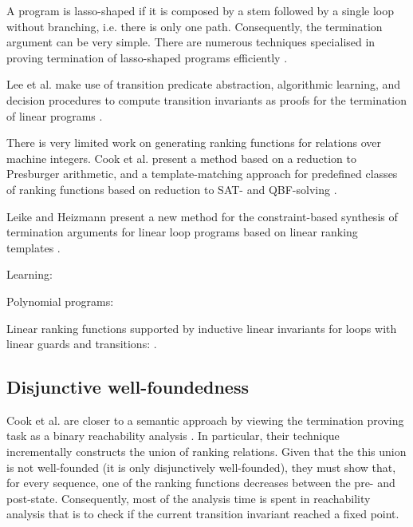 \documentclass[preprint]{sigplanconf}
\theoremstyle{definition}
\begin{document}
A program is lasso-shaped if it is composed by a stem followed by a single loop without branching, i.e. there is only one path. 
Consequently, the termination argument can be very simple. There are numerous techniques specialised in
proving termination of lasso-shaped programs efficiently \cite{DBLP:conf/popl/Ben-AmramG13,DBLP:conf/cav/BradleyMS05,DBLP:conf/atva/HeizmannHLP13,DBLP:conf/vmcai/P04}. 

Lee et al. make use of transition predicate abstraction, algorithmic learning, and decision procedures to compute transition
invariants as proofs for the termination of linear programs \cite{DBLP:conf/cav/LeeWY12}.

There is very limited work on generating ranking functions for relations over machine integers.
Cook et al. present a method based on a reduction to Presburger
arithmetic, and a template-matching approach for predefined classes of
ranking functions based on reduction to SAT- and QBF-solving \cite{DBLP:conf/tacas/CookKRW10}.

Leike and Heizmann present a new method for the constraint-based synthesis
of termination arguments for linear loop programs based on
linear ranking templates \cite{DBLP:conf/tacas/LeikeH14}.

Learning: \cite{DBLP:journals/corr/HeizmannHP14}

Polynomial programs: \cite{DBLP:conf/vmcai/BradleyMS05}

Linear ranking functions supported by inductive linear invariants for loops with linear guards and transitions: \cite{DBLP:conf/cav/BradleyMS05}. 

\subsection{Disjunctive well-foundedness}
Cook et al. are closer to a semantic approach by viewing the termination proving task as a binary reachability analysis \cite{DBLP:conf/pldi/CookPR06}.
In particular, their technique incrementally constructs the union of ranking relations.
Given that the this union is not well-founded (it is only disjunctively well-founded),
they must show that, for every sequence, one of the ranking functions decreases
between the pre- and post-state. %
Consequently, most of the analysis time is spent in reachability analysis that is to check if the current
transition invariant reached a fixed point.
\end{document}
